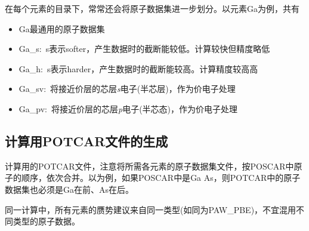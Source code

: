 在每个元素的目录下，常常还会将原子数据集进一步划分。以元素\textrm{Ga}为例，共有
\begin{itemize}
	\item \textrm{Ga}最通用的原子数据集
	\item \textrm{Ga\_s}:~\textrm{s}表示\textrm{softer}，产生数据时的截断能较低。计算较快但精度略低
	\item \textrm{Ga\_h}:~\textrm{s}表示\textrm{harder}，产生数据时的截断能较高。计算精度较高高
	\item \textrm{Ga\_sv}:~将接近价层的芯层\textit{s}电子(半芯层)，作为价电子处理
	\item \textrm{Ga\_pv}:~将接近价层的芯层\textit{p}电子(半芯态)，作为价电子处理
\end{itemize}

\subsection{计算用\rm{POTCAR}文件的生成}
计算用的\textrm{POTCAR}文件，注意将所需各元素的原子数据集文件，按\textrm{POSCAR}中原子的顺序，依次合并。以为例，如果\textrm{POSCAR}中是\textrm{Ga As}，则\textrm{POTCAR}中的原子数据集也必须是\textrm{Ga}在前、\textrm{As}在后。


同一计算中，所有元素的赝势建议来自同一类型(如同为\textrm{PAW\_PBE})，不宜混用不同类型的原子数据。

%
%
%
%
%
%

